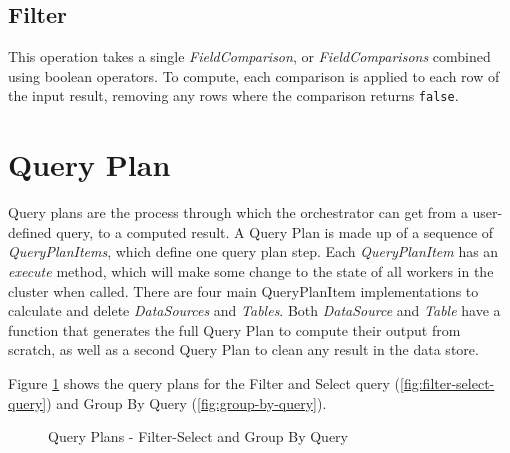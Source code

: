 \subsection{Filter}
This operation takes a single \textit{FieldComparison}, or \textit{FieldComparisons} combined using boolean operators. To compute, each comparison is applied to each row of the input result, removing any rows where the comparison returns \texttt{false}.



\section{Query Plan}
Query plans are the process through which the orchestrator can get from a user-defined query, to a computed result. A Query Plan is made up of a sequence of \textit{QueryPlanItems}, which define one query plan step. Each \textit{QueryPlanItem} has an \textit{execute} method, which will make some change to the state of all workers in the cluster when called. There are four main QueryPlanItem implementations to calculate and delete  \textit{DataSources} and \textit{Tables}. Both \textit{DataSource} and \textit{Table} have a function that generates the full Query Plan to compute their output from scratch, as well as a second Query Plan to clean any result in the data store. 

Figure \ref{fig:filter-group-by-query-plan} shows the query plans for the Filter and Select query (\ref{fig:filter-select-query}) and Group By Query (\ref{fig:group-by-query}).

\begin{figure}
	\centering
	\qquad
	\caption{Query Plans - Filter-Select and Group By Query}%
	\label{fig:filter-group-by-query-plan}
\end{figure}

